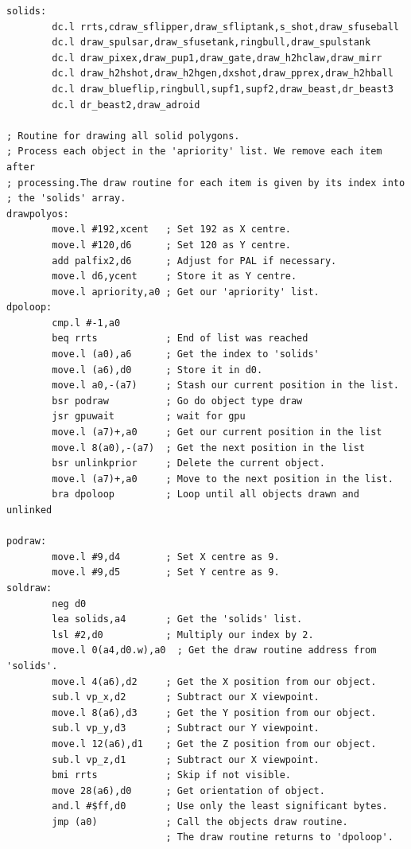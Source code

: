 \begin{lstlisting}
solids: 
        dc.l rrts,cdraw_sflipper,draw_sfliptank,s_shot,draw_sfuseball
        dc.l draw_spulsar,draw_sfusetank,ringbull,draw_spulstank
        dc.l draw_pixex,draw_pup1,draw_gate,draw_h2hclaw,draw_mirr
        dc.l draw_h2hshot,draw_h2hgen,dxshot,draw_pprex,draw_h2hball
        dc.l draw_blueflip,ringbull,supf1,supf2,draw_beast,dr_beast3
        dc.l dr_beast2,draw_adroid            

; Routine for drawing all solid polygons.
; Process each object in the 'apriority' list. We remove each item after
; processing.The draw routine for each item is given by its index into
; the 'solids' array.
drawpolyos:
        move.l #192,xcent   ; Set 192 as X centre.
        move.l #120,d6      ; Set 120 as Y centre.
        add palfix2,d6      ; Adjust for PAL if necessary.
        move.l d6,ycent     ; Store it as Y centre.
        move.l apriority,a0 ; Get our 'apriority' list.
dpoloop:
        cmp.l #-1,a0
        beq rrts            ; End of list was reached
        move.l (a0),a6      ; Get the index to 'solids'
        move.l (a6),d0      ; Store it in d0.
        move.l a0,-(a7)     ; Stash our current position in the list.
        bsr podraw          ; Go do object type draw
        jsr gpuwait         ; wait for gpu
        move.l (a7)+,a0     ; Get our current position in the list
        move.l 8(a0),-(a7)  ; Get the next position in the list
        bsr unlinkprior     ; Delete the current object.
        move.l (a7)+,a0     ; Move to the next position in the list.
        bra dpoloop         ; Loop until all objects drawn and unlinked
 
podraw:
        move.l #9,d4        ; Set X centre as 9.
        move.l #9,d5        ; Set Y centre as 9.
soldraw:
        neg d0
        lea solids,a4       ; Get the 'solids' list.
        lsl #2,d0           ; Multiply our index by 2.
        move.l 0(a4,d0.w),a0  ; Get the draw routine address from 'solids'.
        move.l 4(a6),d2     ; Get the X position from our object.
        sub.l vp_x,d2       ; Subtract our X viewpoint.
        move.l 8(a6),d3     ; Get the Y position from our object.
        sub.l vp_y,d3       ; Subtract our Y viewpoint.
        move.l 12(a6),d1    ; Get the Z position from our object.
        sub.l vp_z,d1       ; Subtract our X viewpoint.
        bmi rrts            ; Skip if not visible.
        move 28(a6),d0      ; Get orientation of object.
        and.l #$ff,d0       ; Use only the least significant bytes.
        jmp (a0)            ; Call the objects draw routine.
                            ; The draw routine returns to 'dpoloop'.
\end{lstlisting}


